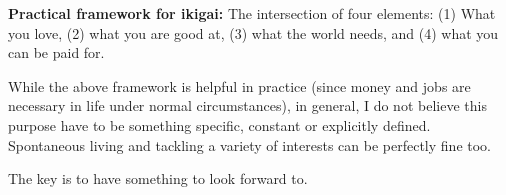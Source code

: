 \documentclass[
]{book}
\begin{document}
\textbf{Practical framework for ikigai:} The intersection of four elements: (1) What you love, (2) what you are good at, (3) what the world needs, and (4) what you can be paid for.

While the above framework is helpful in practice (since money and jobs are necessary in life under normal circumstances), in general, I do not believe this purpose have to be something specific, constant or explicitly defined. Spontaneous living and tackling a variety of interests can be perfectly fine too.

The key is to have something to look forward to.

  
\end{document}
